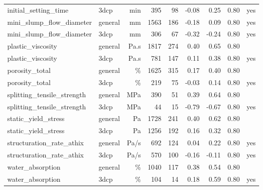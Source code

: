 \begin{tabular}{llrrrrrrc}
initial\_setting\_time & 3dcp & min & 395 & 98 & -0.08 & 0.25 & 0.80 & yes \\
mini\_slump\_flow\_diameter & general & mm & 1563 & 186 & -0.18 & 0.09 & 0.80 & yes \\
mini\_slump\_flow\_diameter & 3dcp & mm & 306 & 67 & -0.32 & -0.24 & 0.80 & yes \\
plastic\_viscosity & general & Pa.s & 1817 & 274 & 0.40 & 0.65 & 0.80 &  \\
plastic\_viscosity & 3dcp & Pa.s & 781 & 147 & 0.11 & 0.38 & 0.80 & yes \\
porosity\_total & general & \% & 1625 & 315 & 0.17 & 0.40 & 0.80 &  \\
porosity\_total & 3dcp & \% & 219 & 75 & -0.03 & 0.14 & 0.80 & yes \\
splitting\_tensile\_strength & general & MPa & 390 & 51 & 0.39 & 0.64 & 0.80 &  \\
splitting\_tensile\_strength & 3dcp & MPa & 44 & 15 & -0.79 & -0.67 & 0.80 & yes \\
static\_yield\_stress & general & Pa & 1728 & 241 & 0.40 & 0.62 & 0.80 &  \\
static\_yield\_stress & 3dcp & Pa & 1256 & 192 & 0.16 & 0.32 & 0.80 &  \\
structuration\_rate\_athix & general & Pa/s & 692 & 124 & 0.04 & 0.22 & 0.80 & yes \\
structuration\_rate\_athix & 3dcp & Pa/s & 570 & 100 & -0.16 & -0.11 & 0.80 & yes \\
water\_absorption & general & \% & 1040 & 117 & 0.38 & 0.54 & 0.80 &  \\
water\_absorption & 3dcp & \% & 104 & 14 & 0.18 & 0.59 & 0.80 & yes \\
\bottomrule
\end{tabular}